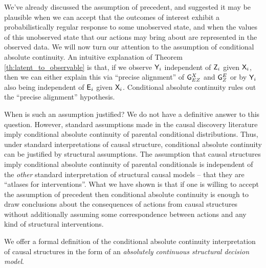 We've already discussed the assumption of precedent, and suggested it may be plausible when we can accept that the outcomes of interest exhibit a probabilistically regular response to some unobserved state, and when the values of this unobserved state that our actions may bring about are represented in the observed data. We will now turn our attention to the assumption of conditional absolute continuity. An intuitive explanation of Theorem \ref{th:latent_to_observable} is that, if we observe $\mathsf{Y}_i$ independent of $\mathsf{Z}_i$ given $\mathsf{X}_i$, then we can either explain this via ``precise alignment'' of $\mathsf{G}^{X}_{EZ}$ and $\mathsf{G}^{E}_{Z}$ or by $\mathsf{Y}_i$ also being independent of $\mathsf{E}_i$ given $\mathsf{X}_i$. Conditional absolute continuity rules out the ``precise alignment'' hypothesis.

When is such an assumption justified? We do not have a definitive answer to this question. However, standard assumptions made in the causal discovery literature imply conditional absolute continuity of parental conditional distributions. Thus, under standard interpretations of causal structure, conditional absolute continuity can be justified by structural assumptions. The assumption that causal structures imply conditional absolute continuity of parental conditionals is independent of the \emph{other} standard interpretation of structural causal models -- that they are ``atlases for interventions''. What we have shown is that if one is willing to accept the assumption of precedent then conditional absolute continuity is enough to draw conclusions about the consequences of actions from causal structures without additionally assuming some correspondence between actions and any kind of structural interventions.

We offer a formal definition of the conditional absolute continuity interpretation of causal structures in the form of an \emph{absolutely continuous structural decision model}.

